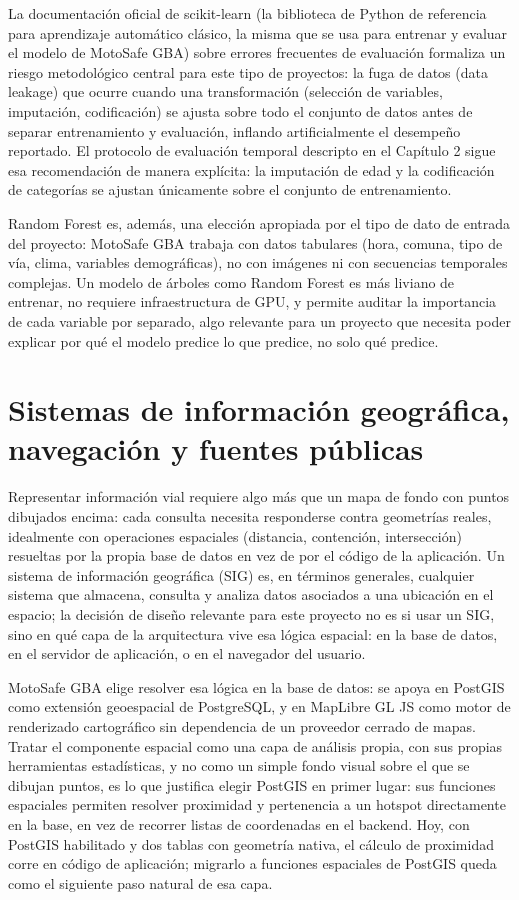La documentación oficial de scikit-learn (la biblioteca de Python de
referencia para aprendizaje automático clásico, la misma que se usa para
entrenar y evaluar el modelo de MotoSafe GBA) sobre errores frecuentes
de evaluación \citep{sklearndocs} formaliza un riesgo
metodológico central para este tipo de proyectos: la fuga de datos (data
leakage) que ocurre cuando una transformación (selección de variables,
imputación, codificación) se ajusta sobre todo el conjunto de datos
antes de separar entrenamiento y evaluación, inflando artificialmente el
desempeño reportado. El protocolo de evaluación temporal descripto en el
Capítulo 2 sigue esa recomendación de manera explícita: la imputación de
edad y la codificación de categorías se ajustan únicamente sobre el
conjunto de entrenamiento.

Random Forest es, además, una elección apropiada por el tipo de dato de
entrada del proyecto: MotoSafe GBA trabaja con datos tabulares (hora,
comuna, tipo de vía, clima, variables demográficas), no con imágenes ni
con secuencias temporales complejas. Un modelo de árboles como Random
Forest es más liviano de entrenar, no requiere infraestructura de GPU, y
permite auditar la importancia de cada variable por separado, algo
relevante para un proyecto que necesita poder explicar por qué el modelo
predice lo que predice, no solo qué predice.

\section{Sistemas de información geográfica, navegación y fuentes públicas}

Representar información vial requiere algo más que un mapa de fondo con
puntos dibujados encima: cada consulta necesita responderse contra
geometrías reales, idealmente con operaciones espaciales (distancia,
contención, intersección) resueltas por la propia base de datos en vez
de por el código de la aplicación. Un sistema de información geográfica
(SIG) es, en términos generales, cualquier sistema que almacena,
consulta y analiza datos asociados a una ubicación en el espacio; la
decisión de diseño relevante para este proyecto no es si usar un SIG,
sino en qué capa de la arquitectura vive esa lógica espacial: en la base
de datos, en el servidor de aplicación, o en el navegador del usuario.

MotoSafe GBA elige resolver esa lógica en la base de datos: se apoya en
PostGIS como extensión geoespacial de PostgreSQL, y en MapLibre GL JS
como motor de renderizado cartográfico sin dependencia de un proveedor
cerrado de mapas. Tratar el componente espacial como una capa de
análisis propia, con sus propias herramientas estadísticas, y no como un
simple fondo visual sobre el que se dibujan puntos, es lo que justifica
elegir PostGIS en primer lugar: sus funciones espaciales permiten
resolver proximidad y pertenencia a un hotspot directamente en la base,
en vez de recorrer listas de coordenadas en el backend. Hoy, con PostGIS
habilitado y dos tablas con geometría nativa, el cálculo de proximidad
corre en código de aplicación; migrarlo a funciones espaciales de
PostGIS queda como el siguiente paso natural de esa capa.

